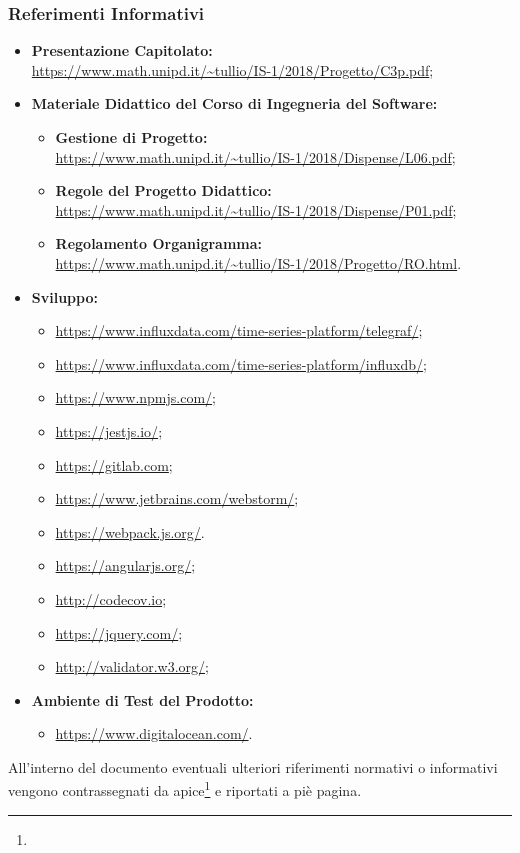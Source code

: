 \subsubsection{Referimenti Informativi}
\begin{itemize}
\item \textbf{Presentazione Capitolato:}\\ \url{https://www.math.unipd.it/~tullio/IS-1/2018/Progetto/C3p.pdf};
\item \textbf{Materiale Didattico del Corso di Ingegneria del Software:}
	\begin{itemize}
	\item \textbf{Gestione di Progetto:}\\ \url{https://www.math.unipd.it/~tullio/IS-1/2018/Dispense/L06.pdf};
	\item \textbf{Regole del Progetto Didattico:}\\ \url{https://www.math.unipd.it/~tullio/IS-1/2018/Dispense/P01.pdf};
	\item \textbf{Regolamento Organigramma:}\\ \url{https://www.math.unipd.it/~tullio/IS-1/2018/Progetto/RO.html}.
	\end{itemize}
\item \textbf{Sviluppo:}
	\begin{itemize}
	\item \url{https://www.influxdata.com/time-series-platform/telegraf/};
	\item \url{https://www.influxdata.com/time-series-platform/influxdb/};
	\item \url{https://www.npmjs.com/};
	\item \url{https://jestjs.io/};
	\item \url{https://gitlab.com};
	\item \url{https://www.jetbrains.com/webstorm/};
	\item \url{https://webpack.js.org/}.
	\item \url{https://angularjs.org/};
	\item \url{http://codecov.io};
	\item \url{https://jquery.com/};
	\item \url{http://validator.w3.org/};
	
	\end{itemize}
\item \textbf{Ambiente di Test del Prodotto:}
\begin{itemize}
	\item \url{https://www.digitalocean.com/}.
\end{itemize}
\end{itemize}

All'interno del documento eventuali ulteriori riferimenti normativi o informativi vengono contrassegnati da apice\footnote{} e riportati a piè pagina.